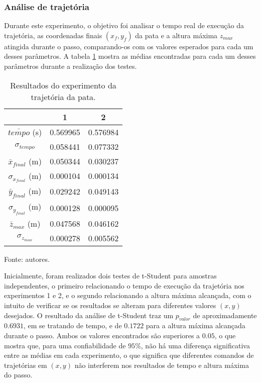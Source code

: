 \documentclass[../main.tex]{subfiles}
\begin{document}
  \subsubsection{Análise de trajetória}
  Durante este experimento, o objetivo foi analisar o tempo real de execução da trajetória, as coordenadas finais $(x_f, y_f)$ da pata e a altura máxima $z_{max}$ atingida durante o passo, comparando-os com os valores esperados para cada um desses parâmetros. A tabela \ref{tab:trajetoria} mostra as médias encontradas para cada um desses parâmetros durante a realização dos testes.

  \begin{table}[h]
    \caption{Resultados do experimento da trajetória da pata.}
    \centering
    \begin{tabular}{ccc}
      \hline
                            & 1         & 2        \\
      \hline
      $\bar{tempo}$ (s)          & 0.569965  & 0.576984 \\
      \hline
      $\sigma_{tempo}$            & 0.058441  & 0.077332 \\
      \hline
      $\bar{x}_{final}$ (m)     & 0.050344  & 0.030237 \\
      \hline
      $\sigma_{x_{final}}$ (m)  & 0.000104  & 0.000134 \\
      \hline
      $\bar{y}_{final}$ (m)     & 0.029242  & 0.049143 \\      
      \hline
      $\sigma_{y_{final}}$ (m)  & 0.000128  & 0.000095 \\      
      \hline
      $\bar{z}_{max}$ (m)       & 0.047568  & 0.046162 \\      
      \hline
      $\sigma_{z_{max}}$    & 0.000278  & 0.005562 \\
      \hline   
    \end{tabular}

    Fonte: autores.
    \label{tab:trajetoria}
  \end{table}

  Inicialmente, foram realizados dois testes de t-Student para amostras independentes, o primeiro relacionando o tempo de execução da trajetória nos experimentos 1 e 2, e o segundo relacionando a altura máxima alcançada, com o intuito de verificar se os resultados se alteram para diferentes valores $(x, y)$ desejados. O resultado da análise de t-Student traz um $p_{valor}$ de aproximadamente $0.6931$, em se tratando de tempo, e de $0.1722$ para a altura máxima alcançada durante o passo. Ambos os valores encontrados são superiores a $0.05$, o que mostra que, para uma confiabilidade de $95\%$, não há uma diferença significativa entre as médias em cada experimento, o que significa que diferentes comandos de trajetórias em $(x, y)$ não interferem nos resultados de tempo e altura máxima do passo.
  
\end{document}
